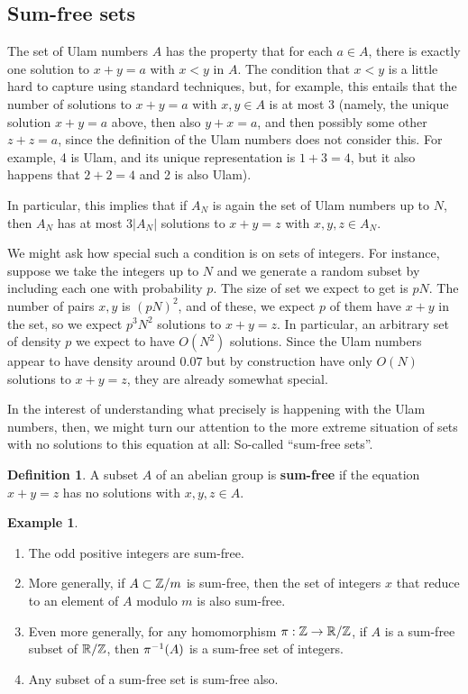 \documentclass{article}
\theoremstyle{definition}
\newtheorem{definition}{Definition}
\newtheorem{example}{Example}
\theoremstyle{remark}
\numberwithin{equation}{section}
\begin{document}
\subsection{Sum-free sets}

The set of Ulam numbers $A$ has the property that for each $a \in A$,
there is exactly one solution to $x+y=a$ with $x < y$ in $A$.  The
condition that $x < y$ is a little hard to capture using standard
techniques, but, for example, this entails that the number of
solutions to $x + y = a$ with $x, y \in A$ is at most 3 (namely, the
unique solution $x+y = a$ above, then also $y+x = a$, and then
possibly some other $z+z = a$, since the definition of the Ulam
numbers does not consider this.  For example, 4 is Ulam, and its
unique representation is $1+3=4$, but it also happens that $2+2=4$ and
2 is also Ulam).

In particular, this implies that if $A_N$ is again the set of Ulam
numbers up to $N$, then $A_N$ has at most $3|A_N|$ solutions to $x+y =
z$ with $x, y, z \in A_N$.  

We might ask how special such a condition is on sets of integers.  For
instance, suppose we take the integers up to $N$ and we generate a
random subset by including each one with probability $p$.  The size of
set we expect to get is $pN$.  The number of pairs $x,y$ is $(pN)^2$,
and of these, we expect $p$ of them have $x+y$ in the set, so we
expect $p^3 N^2$ solutions to $x+y=z$.  In particular, an arbitrary
set of density $p$ we expect to have $O(N^2)$ solutions.  Since the
Ulam numbers appear to have density around $0.07$ but by construction
have only $O(N)$ solutions to $x+y=z$, they are already somewhat
special.  

In the interest of understanding what precisely is happening with the
Ulam numbers, then, we might turn our attention to the more extreme
situation of sets with no solutions to this equation at all: So-called
``sum-free sets''.  

\begin{definition}
  A subset $A$ of an abelian group is \textbf{sum-free} if the
  equation $x+y=z$ has no solutions with $x, y, z \in A$.
\end{definition}

\begin{example}
\begin{enumerate}
\item The odd positive integers are sum-free.  
\item More generally, if $A \subset \mathbb{Z}/m$ is sum-free, then the set of
  integers $x$ that reduce to an element of $A$ modulo $m$ is also
  sum-free.  
\item Even more generally, for any homomorphism $\pi : \mathbb{Z} \to \mathbb{R}/\mathbb{Z}$,
  if $A$ is a sum-free subset of $\mathbb{R}/\mathbb{Z}$, then $\pi^{-1}(A)$ is a
  sum-free set of integers.
\item Any subset of a sum-free set is sum-free also.
\end{enumerate}
\end{example}
\end{document}
